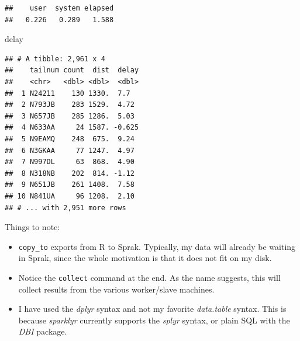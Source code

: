 \documentclass[]{book}
\newenvironment{Shaded}{\begin{snugshade}}{\end{snugshade}}
\newcommand{\DataTypeTok}[1]{\textcolor[rgb]{0.13,0.29,0.53}{#1}}
\newcommand{\DecValTok}[1]{\textcolor[rgb]{0.00,0.00,0.81}{#1}}
\newcommand{\KeywordTok}[1]{\textcolor[rgb]{0.13,0.29,0.53}{\textbf{#1}}}
\newcommand{\NormalTok}[1]{#1}
\newcommand{\OperatorTok}[1]{\textcolor[rgb]{0.81,0.36,0.00}{\textbf{#1}}}
\newcommand{\OtherTok}[1]{\textcolor[rgb]{0.56,0.35,0.01}{#1}}
\newcommand{\StringTok}[1]{\textcolor[rgb]{0.31,0.60,0.02}{#1}}
\providecommand{\tightlist}{%
  \setlength{\itemsep}{0pt}\setlength{\parskip}{0pt}}
\theoremstyle{definition}
\theoremstyle{definition}
\theoremstyle{definition}
\theoremstyle{remark}
\begin{document}
\begin{Shaded}
\end{Shaded}

\begin{verbatim}
##    user  system elapsed 
##   0.226   0.289   1.588
\end{verbatim}

\begin{Shaded}
\begin{Highlighting}[]
\NormalTok{delay}
\end{Highlighting}
\end{Shaded}

\begin{verbatim}
## # A tibble: 2,961 x 4
##    tailnum count  dist  delay
##    <chr>   <dbl> <dbl>  <dbl>
##  1 N24211    130 1330.  7.7  
##  2 N793JB    283 1529.  4.72 
##  3 N657JB    285 1286.  5.03 
##  4 N633AA     24 1587. -0.625
##  5 N9EAMQ    248  675.  9.24 
##  6 N3GKAA     77 1247.  4.97 
##  7 N997DL     63  868.  4.90 
##  8 N318NB    202  814. -1.12 
##  9 N651JB    261 1408.  7.58 
## 10 N841UA     96 1208.  2.10 
## # ... with 2,951 more rows
\end{verbatim}

Things to note:

\begin{itemize}
\tightlist
\item
  \texttt{copy\_to} exports from R to Sprak. Typically, my data will already be waiting in Sprak, since the whole motivation is that it does not fit on my disk.
\item
  Notice the \texttt{collect} command at the end. As the name suggests, this will collect results from the various worker/slave machines.
\item
  I have used the \emph{dplyr} syntax and not my favorite \emph{data.table} syntax. This is because \emph{sparklyr} currently supports the \emph{splyr} syntax, or plain SQL with the \emph{DBI} package.
\end{itemize}
\end{document}
